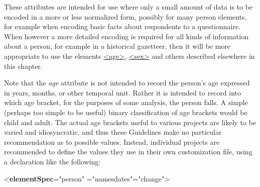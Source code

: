 \par
These attributes are intended for use where only a small amount of data is to be encoded in a more or less normalized form, possibly for many person elements, for example when encoding basic facts about respondents to a questionnaire. When however a more detailed encoding is required for all kinds of information about a person, for example in a historical gazetteer, then it will be more appropriate to use the elements \hyperref[TEI.age]{<age>}, \hyperref[TEI.sex]{<sex>} and others described elsewhere in this chapter.\par
Note that the {\itshape age} attribute is not intended to record the person's age expressed in years, months, or other temporal unit. Rather it is intended to record into which age bracket, for the purposes of some analysis, the person falls. A simple (perhaps too simple to be useful) binary classification of age brackets would be child and adult. The actual age brackets useful to various projects are likely to be varied and idiosyncratic, and thus these Guidelines make no particular recommendation as to possible values. Instead, individual projects are recommended to define the values they use in their own customization file, using a declaration like the following: \par\bgroup{}\exampleFont \begin{shaded}\noindent\mbox{}{<\textbf{elementSpec}\hspace*{1em}{ident}="{person}"\mbox{}\newline 
\hspace*{1em}{module}="{namesdates}"\hspace*{1em}{mode}="{change}">}\mbox{}\newline 

\end{shaded}

